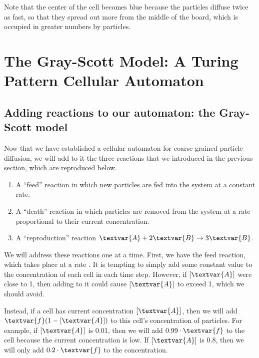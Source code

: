 Note that the center of the cell becomes blue because the  particles diffuse twice as fast, so that they spread out more from the middle of the board, which is occupied in greater numbers by  particles.\\

\FloatBarrier
{}
\section{The Gray-Scott Model: A Turing Pattern Cellular Automaton}
\label{sec:the_gray-scott_model:_a_turing_pattern_cellular_automaton}

\FloatBarrier
{}
\subsection{Adding reactions to our automaton: the Gray-Scott model}

Now that we have established a cellular automaton for coarse-grained particle diffusion, we will add to it the three reactions that we introduced in the previous section, which are reproduced below.

\begin{enumerate}
\item A ``feed'' reaction in which new  particles are fed into the system at a constant rate.
\item A ``death'' reaction in which  particles are removed from the system at a rate proportional to their current concentration.
\item A ``reproduction'' reaction $\textvar{A} + 2\textvar{B} \rightarrow 3\textvar{B}$.
\end{enumerate}

\begin{qbox}\end{qbox}

We will address these reactions one at a time. First, we have the feed reaction, which takes place at a rate . It is tempting to simply add some constant value  to the concentration of each cell in each time step. However, if $[\textvar{A}]$ were close to 1, then adding  to it could cause $[\textvar{A}]$ to exceed 1, which we should avoid.

Instead, if a cell has current concentration $[\textvar{A}]$, then we will add $\textvar{f}(1-[\textvar{A}])$ to this cell's concentration of  particles. For example, if $[\textvar{A}]$ is 0.01, then we will add $0.99 \cdot \textvar{f}$ to the cell because the current concentration is low. If $[\textvar{A}]$ is 0.8, then we will only add $0.2 \cdot \textvar{f}$ to the concentration.

